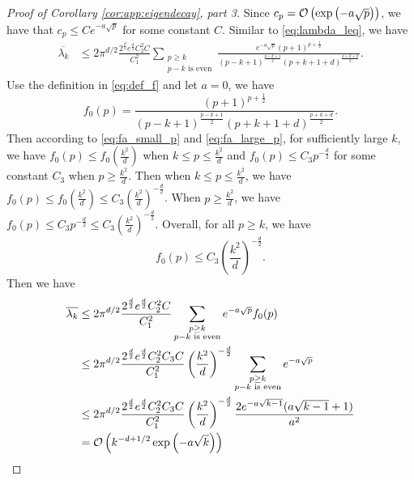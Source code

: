 \begin{proof}[Proof of Corollary \ref{cor:app:eigendecay}, part 3]
Since $c_p = \mathcal{O}\left(\exp\left( - a\sqrt{p}\right) \right)$, 
 we have that $c_p\leq C e^{-a\sqrt{p}}$ for some constant $C$. 
Similar to \eqref{eq:lambda_leq}, we have
\begin{align}
\overline{\lambda_k} 
&\leq 2\pi^{d/2}\frac{2^{\frac{d}{2}}e^{\frac{d}{2}}C_2^2C}{C_1^2}\sum_{\substack{p\geq k\\p-k\text{ is even}}} \frac{  e^{-a\sqrt{p}}\left({p+1}\right)^{p+\frac{1}{2}}}{\left({p-k+1}\right)^{\frac{p-k+1}{2}}\left({p+k+1+d}\right)^{\frac{p+k+d}{2}}}.
\end{align}
Use the definition in \eqref{eq:def_f} and let $a=0$, we have
\begin{equation}
f_0(p)=\frac{\left({p+1}\right)^{p+\frac{1}{2}}}{\left({p-k+1}\right)^{\frac{p-k+1}{2}}\left({p+k+1+d}\right)^{\frac{p+k+d}{2}}}. 
\end{equation}
Then according to \eqref{eq:fa_small_p} and \eqref{eq:fa_large_p}, for sufficiently large $k$, we have $f_0(p)\leq f_0\left(\frac{k^2}{d}\right)$ when $k\leq p \leq \frac{k^2}{d}$ and $f_0(p)\leq C_3p^{-\frac{d}{2}}$ for some constant $C_3$ when $p\geq \frac{k^2}{d}$. Then when $k\leq p \leq \frac{k^2}{d}$, we have $f_0(p)\leq f_0\left(\frac{k^2}{d}\right)\leq C_3 \left(\frac{k^2}{d}\right)^{-\frac{d}{2}}$. When $p\geq \frac{k^2}{d}$, we have $f_0(p)\leq C_3p^{-\frac{d}{2}}\leq C_3\left(\frac{k^2}{d}\right)^{-\frac{d}{2}}$. Overall, for all $p\geq k$, we have
\begin{equation}
f_0(p)\leq  C_3\left(\frac{k^2}{d}\right)^{-\frac{d}{2}}.
\end{equation}
Then we have 
\begin{align}
\overline{\lambda_k} 
&\leq 2\pi^{d/2}\frac{2^{\frac{d}{2}}e^{\frac{d}{2}}C_2^2C}{C_1^2}\sum_{\substack{p\geq k\\p-k\text{ is even}}} e^{-a\sqrt{p}}f_0(p)\\
&\leq 2\pi^{d/2}\frac{2^{\frac{d}{2}}e^{\frac{d}{2}}C_2^2C_3C}{C_1^2}\left(\frac{k^2}{d}\right)^{-\frac{d}{2}}\sum_{\substack{p\geq k\\p-k\text{ is even}}} e^{-a\sqrt{p}}\\
&\leq 2\pi^{d/2}\frac{2^{\frac{d}{2}}e^{\frac{d}{2}}C_2^2C_3C}{C_1^2}\left(\frac{k^2}{d}\right)^{-\frac{d}{2}}\frac{2e^{-a\sqrt{k-1}}(a\sqrt{k-1}+1)}{a^2}\\
&=\mathcal{O}\left(k^{-d+1/2}\exp\left( - a\sqrt{k}\right) \right)
\end{align}
\end{proof}

